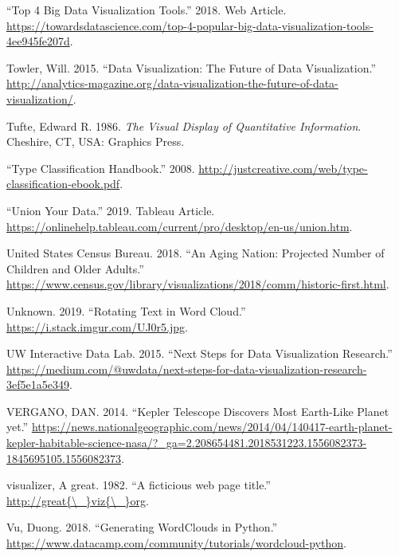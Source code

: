 \documentclass[]{book}
\begin{document}
\leavevmode\hypertarget{ref-top4_viz_tools}{}%
``Top 4 Big Data Visualization Tools.'' 2018. Web Article. \url{https://towardsdatascience.com/top-4-popular-big-data-visualization-tools-4ee945fe207d}.

\leavevmode\hypertarget{ref-future_viz}{}%
Towler, Will. 2015. ``Data Visualization: The Future of Data Visualization.'' \url{http://analytics-magazine.org/data-visualization-the-future-of-data-visualization/}.

\leavevmode\hypertarget{ref-The-Visual-Display-of-Quantitative-Information}{}%
Tufte, Edward R. 1986. \emph{The Visual Display of Quantitative Information}. Cheshire, CT, USA: Graphics Press.

\leavevmode\hypertarget{ref-type_class}{}%
``Type Classification Handbook.'' 2008. \url{http://justcreative.com/web/type-classification-ebook.pdf}.

\leavevmode\hypertarget{ref-Tableau_Union}{}%
``Union Your Data.'' 2019. Tableau Article. \url{https://onlinehelp.tableau.com/current/pro/desktop/en-us/union.htm}.

\leavevmode\hypertarget{ref-aging_nation}{}%
United States Census Bureau. 2018. ``An Aging Nation: Projected Number of Children and Older Adults.'' \url{https://www.census.gov/library/visualizations/2018/comm/historic-first.html}.

\leavevmode\hypertarget{ref-wordCloudimage}{}%
Unknown. 2019. ``Rotating Text in Word Cloud.'' \url{https://i.stack.imgur.com/UJ0r5.jpg}.

\leavevmode\hypertarget{ref-Next_Steps}{}%
UW Interactive Data Lab. 2015. ``Next Steps for Data Visualization Research.'' \url{https://medium.com/@uwdata/next-steps-for-data-visualization-research-3ef5e1a5e349}.

\leavevmode\hypertarget{ref-Dan}{}%
VERGANO, DAN. 2014. ``Kepler Telescope Discovers Most Earth-Like Planet yet.'' \url{https://news.nationalgeographic.com/news/2014/04/140417-earth-planet-kepler-habitable-science-nasa/?_ga=2.208654481.2018531223.1556082373-1845695105.1556082373}.

\leavevmode\hypertarget{ref-great_viz}{}%
visualizer, A great. 1982. ``A ficticious web page title.'' \href{http://great\%7B/_\%7Dviz\%7B/_\%7Dorg}{http://great\{\textbackslash{}\_\}viz\{\textbackslash{}\_\}org}.

\leavevmode\hypertarget{ref-python_wordcloud}{}%
Vu, Duong. 2018. ``Generating WordClouds in Python.'' \url{https://www.datacamp.com/community/tutorials/wordcloud-python}.
\end{document}
